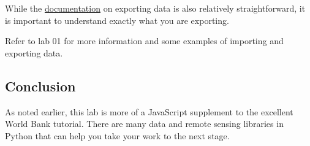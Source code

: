 \documentclass[
]{article}
\begin{document}
While the \href{https://developers.google.com/earth-engine/guides/exporting?hl=en}{documentation} on exporting data is also relatively straightforward, it is important to understand exactly what you are exporting.

Refer to lab 01 for more information and some examples of importing and exporting data.

\hypertarget{conclusion}{%
\subsection{Conclusion}\label{conclusion}}

As noted earlier, this lab is more of a JavaScript supplement to the excellent World Bank tutorial. There are many data and remote sensing libraries in Python that can help you take your work to the next stage.
\end{document}
